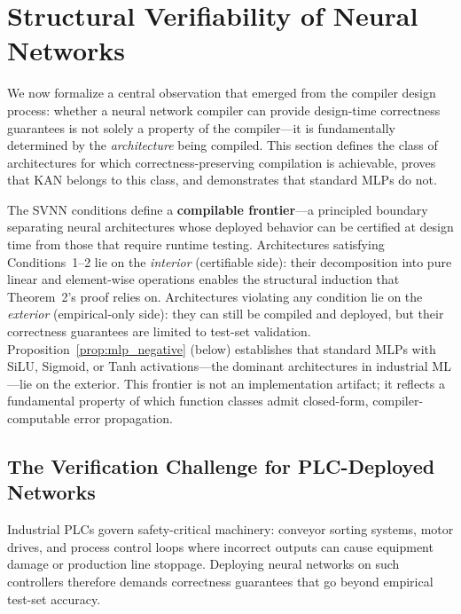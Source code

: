 \section{Structural Verifiability of Neural Networks}
\label{sec:svnn}

We now formalize a central observation that emerged from the compiler design
process: whether a neural network compiler can provide design-time correctness
guarantees is not solely a property of the compiler---it is fundamentally
determined by the \textit{architecture} being compiled. This section defines
the class of architectures for which correctness-preserving compilation is
achievable, proves that KAN belongs to this class, and demonstrates that
standard MLPs do not.

\vspace{4pt}
\begin{remark}
\label{rem:compilable_frontier}
The SVNN conditions define a \textbf{compilable frontier}---a principled
boundary separating neural architectures whose deployed behavior can be
certified at design time from those that require runtime testing. Architectures
satisfying Conditions~1--2 lie on the \textit{interior} (certifiable side):
their decomposition into pure linear and element-wise operations enables the
structural induction that Theorem~2's proof relies on. Architectures violating
any condition lie on the \textit{exterior} (empirical-only side): they can
still be compiled and deployed, but their correctness guarantees are limited
to test-set validation. Proposition~\ref{prop:mlp_negative} (below) establishes that standard MLPs
with SiLU, Sigmoid, or Tanh activations---the dominant architectures in
industrial ML---lie on the exterior. This frontier is not an implementation
artifact; it reflects a fundamental property of which function classes admit
closed-form, compiler-computable error propagation.
\end{remark}


\subsection{The Verification Challenge for PLC-Deployed Networks}
\label{sec:svnn-challenge}

Industrial PLCs govern safety-critical machinery: conveyor sorting systems,
motor drives, and process control loops where incorrect outputs can cause
equipment damage or production line stoppage. Deploying neural networks on
such controllers therefore demands correctness guarantees that go beyond
empirical test-set accuracy.

